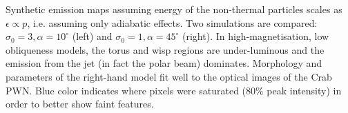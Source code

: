 Synthetic emission maps assuming energy of the non-thermal particles scales as  $\epsilon\propto p$,  i.e. assuming only adiabatic effects.  Two simulations are compared: $\sigma_0=3,\alpha=10^\circ$ (left) and $\sigma_0=1,\alpha=45^\circ$ (right).  In high-magnetisation, low obliqueness models, the torus and wisp regions are under-luminous and the emission from the jet (in fact the polar beam) dominates.  Morphology and parameters of the right-hand model fit well to the optical images of the Crab PWN.  Blue color indicates where pixels were saturated ($80\%$ peak intensity) in order to better show faint features.